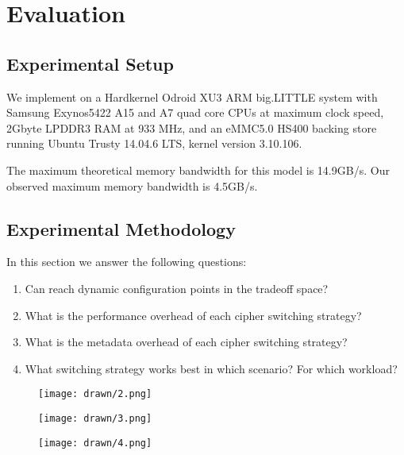 \section{Evaluation}\label{sec:evaluation}

\subsection{Experimental Setup}

We implement \SYSTEM{} on a Hardkernel Odroid XU3 ARM big.LITTLE system with
Samsung Exynos5422 A15 and A7 quad core CPUs at maximum clock speed, 2Gbyte
LPDDR3 RAM at 933 MHz, and an eMMC5.0 HS400 backing store running Ubuntu Trusty
14.04.6 LTS, kernel version 3.10.106.

The maximum theoretical memory bandwidth for this model is 14.9GB/s\@. Our
observed maximum memory bandwidth is 4.5GB/s.

\subsection{Experimental Methodology}

In this section we answer the following questions:

\begin{enumerate}
 \item Can \SYSTEM{} reach dynamic configuration points in the tradeoff space?
 \item What is the performance overhead of each cipher switching strategy?
 \item What is the metadata overhead of each cipher switching strategy?
 \item What switching strategy works best in which scenario? For which workload?
\end{enumerate}

\begin{figure}[ht]
 \centering
  \texttt{[image: drawn/2.png]}
   \caption{}\label{fig:40mb-vs-1kb-read}
\end{figure}

\begin{figure}[ht]
 \centering
  \texttt{[image: drawn/3.png]}
   \caption{}\label{fig:40mb-read-vs-write}
\end{figure}

\begin{figure}[ht]
 \centering
  \texttt{[image: drawn/4.png]}
   \caption{}\label{fig:navigating-the-space}
\end{figure}

